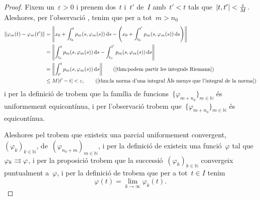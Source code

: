 \documentclass[../../main.tex]{subfiles}
\begin{document}
\begin{proof}
        Fixem un~\(\varepsilon>0\) i prenem dos~\(t\) i~\(t'\) de~\(I\) amb~\(t'<t\) tals que~\(\abs{t,t'}<\frac{\varepsilon}{M}\).
        Aleshores, per l'observació , tenim que per a tot~\(m>n_{0}\)
        \begin{align*}
            \norm{\varphi_{m}(t)-\varphi_{m}(t')}&=\norm{x_{0}+\int_{t_{0}}^{t}p_{m}(s,\varphi_{m}(s))\diff s-\Bigg(x_{0}+\int_{t_{0}}^{t'}p_{m}(s,\varphi_{m}(s))\diff s\Bigg)} \\
            &=\norm{\int_{t_{0}}^{t}p_{m}(s,\varphi_{m}(s))\diff s-\int_{t_{0}}^{t'}p_{m}(s,\varphi_{m}(s))\diff s} \\
            &=\norm{\int_{t'}^{t}p_{m}(s,\varphi_{m}(s))\diff s} \tag{\ref{thm:podem partir les integrals Riemann}} \\
            &\leq M\abs{t'-t}<\varepsilon, \tag{\ref{thm:la norma d'una integral és menys que l'integral de la norma}}
        \end{align*}
        i per la definició de  trobem que la família de funcions~\(\{\varphi_{m+n_{0}}\}_{m\in\mathbb{N}}\) és uniformement equicontínua, i per l'observació  trobem que~\(\{\varphi_{m+n_{0}}\}_{m\in\mathbb{N}}\) és equicontínua.

        Aleshores pel  trobem que existeix una parcial uniformement convergent,~\((\varphi_{k})_{k\in\mathbb{N}}\), de~\((\varphi_{n_{0}+m})_{m\in\mathbb{N}}\), i per la definició de  existeix una funció~\(\varphi\) tal que~\(\varphi_{k}\mathrel{\rightrightarrows}\varphi\), i per la proposició  trobem que la successió~\((\varphi_{k})_{k\in\mathbb{N}}\) convergeix puntualment a~\(\varphi\), i per la definició de  trobem que per a tot~\(t\in I\) tenim
        \begin{equation}
            \label{thm:Teorema de Peano:eq1}
            \varphi(t)=\lim_{k\to\infty}\varphi_{k}(t).
        \end{equation}


\end{proof}
\end{document}

